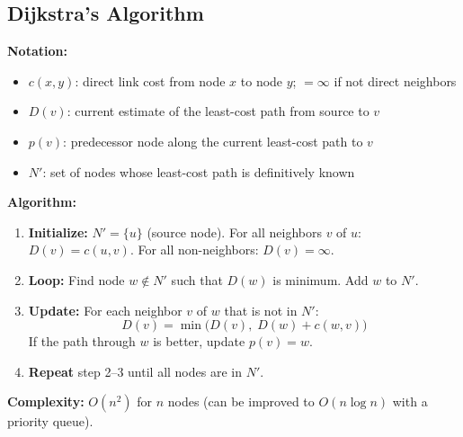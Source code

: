 \subsection{Dijkstra's Algorithm}

\begin{formulabox}
\textbf{Notation:}
\begin{itemize}[noitemsep]
    \item $c(x,y)$: direct link cost from node $x$ to node $y$; $= \infty$ if not direct neighbors
    \item $D(v)$: current estimate of the least-cost path from source to $v$
    \item $p(v)$: predecessor node along the current least-cost path to $v$
    \item $N'$: set of nodes whose least-cost path is definitively known
\end{itemize}

\textbf{Algorithm:}
\begin{enumerate}[noitemsep]
    \item \textbf{Initialize:} $N' = \{u\}$ (source node). For all neighbors $v$ of $u$: $D(v) = c(u,v)$. For all non-neighbors: $D(v) = \infty$.
    \item \textbf{Loop:} Find node $w \notin N'$ such that $D(w)$ is minimum. Add $w$ to $N'$.
    \item \textbf{Update:} For each neighbor $v$ of $w$ that is not in $N'$:
    \[
    D(v) = \min\big(D(v),\; D(w) + c(w,v)\big)
    \]
    If the path through $w$ is better, update $p(v) = w$.
    \item \textbf{Repeat} step 2--3 until all nodes are in $N'$.
\end{enumerate}

\textbf{Complexity:} $O(n^2)$ for $n$ nodes (can be improved to $O(n \log n)$ with a priority queue).
\end{formulabox}

